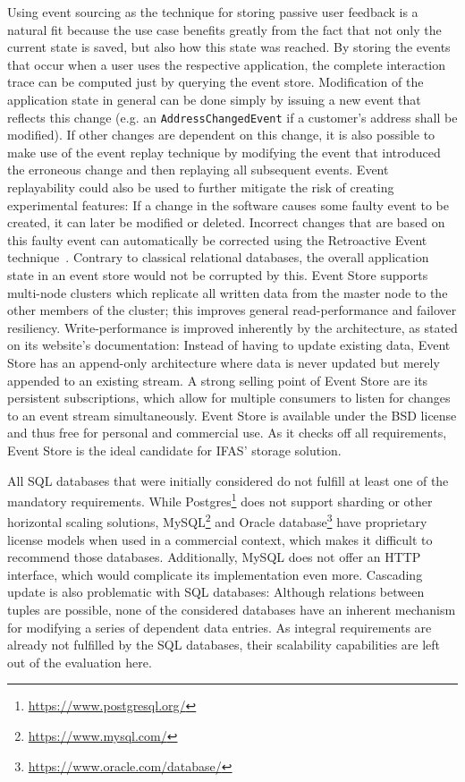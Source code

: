 Using event sourcing as the technique for storing passive user feedback is a natural fit because the use case benefits greatly from the fact that not only the current state is saved, but also how this state was reached.
By storing the events that occur when a user uses the respective application, the complete interaction trace can be computed just by querying the event store.
Modification of the application state in general can be done simply by issuing a new event that reflects this change (e.g. an \texttt{AddressChangedEvent} if a customer's address shall be modified).
If other changes are dependent on this change, it is also possible to make use of the event replay technique by modifying the event that introduced the erroneous change and then replaying all subsequent events.
Event replayability could also be used to further mitigate the risk of creating experimental features: If a change in the software causes some faulty event to be created, it can later be modified or deleted.
Incorrect changes that are based on this faulty event can automatically be corrected using the Retroactive Event technique~\cite{WEB:Fowler:2005-3}.
Contrary to classical relational databases, the overall application state in an event store would not be corrupted by this.
Event Store supports multi-node clusters which replicate all written data from the master node to the other members of the cluster; this improves general read-performance and failover resiliency.
Write-performance is improved inherently by the architecture, as stated on its website's documentation:
Instead of having to update existing data, Event Store has an append-only architecture where data is never updated but merely appended to an existing stream.
A strong selling point of Event Store are its persistent subscriptions, which allow for multiple consumers to listen for changes to an event stream simultaneously.
Event Store is available under the BSD license and thus free for personal and commercial use.
As it checks off all requirements, Event Store is the ideal candidate for \ac{IFAS}' storage solution.

All \ac{SQL} databases that were initially considered do not fulfill at least one of the mandatory requirements.
While Postgres\footnote{\url{https://www.postgresql.org/}} does not support sharding or other horizontal scaling solutions, MySQL\footnote{\url{https://www.mysql.com/}} and Oracle database\footnote{\url{https://www.oracle.com/database/}} have proprietary license models when used in a commercial context, which makes it difficult to recommend those databases.
Additionally, MySQL does not offer an HTTP interface, which would complicate its implementation even more.
Cascading update is also problematic with \ac{SQL} databases: Although relations between tuples are possible, none of the considered databases have an inherent mechanism for modifying a series of dependent data entries.
As integral requirements are already not fulfilled by the \ac{SQL} databases, their scalability capabilities are left out of the evaluation here.

